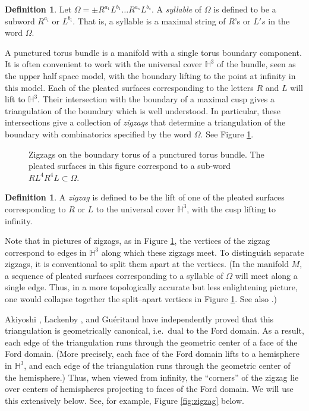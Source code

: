 \documentclass[11pt]{amsart}
\newcommand{\HH}{{\mathbb{H}}}
\theoremstyle{plain}
\theoremstyle{definition}
\newtheorem{define}[theorem]{Definition}
\begin{document}
\begin{define}
Let $\Omega = \pm R^{a_1}L^{b_1}\dots R^{a_s}L^{b_s}$.  A
\emph{syllable} of $\Omega$ is defined to be a subword $R^{a_i}$ or
$L^{b_i}$.  That is, a syllable is a maximal string of $R$'s or $L's$
in the word $\Omega$.
\end{define}


A punctured torus bundle is a manifold with a single torus boundary
component.  It is often convenient to work with the universal cover
$\HH^3$ of the bundle, seen as the upper half space model, with the
boundary lifting to the point at infinity in this model.  Each of the
pleated surfaces corresponding to the letters $R$ and $L$ will lift to
$\HH^3$.  Their intersection with the boundary of a maximal cusp gives
a triangulation of the boundary which is well understood.  In
particular, these intersections give a collection of \emph{zigzags}
that determine a triangulation of the boundary with combinatorics
specified by the word $\Omega$.  See Figure \ref{fig:stack}.

\begin{figure}%
\begin{center}

\end{center}
\caption{Zigzags on the boundary torus of a punctured torus
bundle. The pleated surfaces in this figure correspond to a sub-word
$R L^4 R^4 L \subset \Omega$.}
\label{fig:stack}
\end{figure}

\begin{define}
A \emph{zigzag} is defined to be the lift of one of the pleated
surfaces corresponding to $R$ or $L$ to the universal cover $\HH^3$,
with the cusp lifting to infinity.
\end{define}

Note that in pictures of zigzags, as in Figure \ref{fig:stack}, the
vertices of the zigzag correspond to edges in $\HH^3$ along which
these zigzags meet.  To distinguish separate zigzags, it is
conventional to split them apart at the vertices.  (In the manifold
$M$, a sequence of pleated surfaces corresponding to a syllable of
$\Omega$ will meet along a single edge.  Thus, in a more topologically
accurate but less enlightening picture, one would collapse together
the split--apart vertices in Figure \ref{fig:stack}.  See also
\cite[Figure 4]{gf:two-bridge}.)

Akiyoshi \cite{akiyoshi}, Lackenby \cite{lackenby:punct}, and
Gu\'eritaud \cite{gueritaud:thesis} have independently proved that
this triangulation is geometrically canonical, i.e.\ dual to the Ford
domain.  As a result, each edge of the triangulation runs through the
geometric center of a face of the Ford domain.
(More precisely, each face of the Ford domain lifts to a hemisphere in
$\HH^3$, and each edge of the triangulation runs through the geometric
center of the hemisphere.)  Thus, when viewed from infinity, the
``corners'' of the zigzag lie over centers of hemispheres projecting
to faces of the Ford domain.  We will use this extensively below.
See, for example, Figure \ref{fig:zigzag} below.
\end{document}
